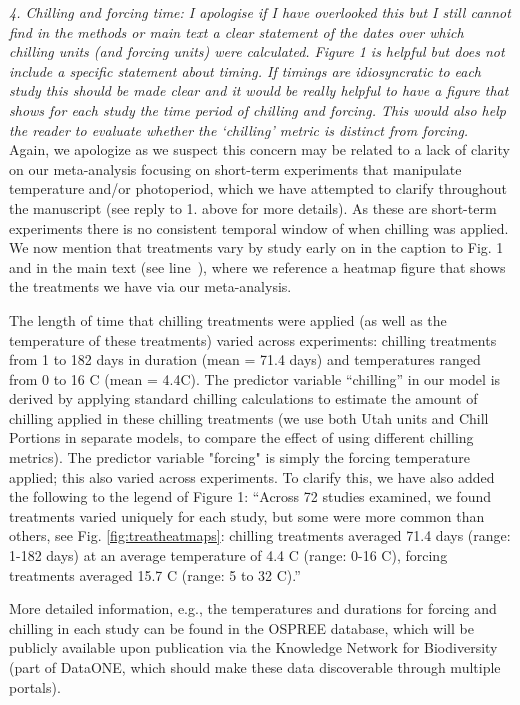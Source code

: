 \documentclass{article}
\newcommand{\lr}[1]{line~\lineref{#1}}
\begin{document}
\emph{4. Chilling and forcing time: I apologise if I have overlooked this but I still cannot find in the
methods or main text a clear statement of the dates over which chilling units (and forcing
units) were calculated. Figure 1 is helpful but does not include a specific statement about
timing. If timings are idiosyncratic to each study this should be made clear and it would be
really helpful to have a figure that shows for each study the time period of chilling and forcing.
This would also help the reader to evaluate whether the `chilling' metric is distinct from
forcing.}\\

Again, we apologize as we suspect this concern may be related to a lack of clarity on our meta-analysis focusing on short-term experiments that manipulate temperature and/or photoperiod, which we have attempted to clarify throughout the manuscript (see reply to 1. above for more details). As these are short-term experiments there is no consistent temporal window of when chilling was applied. We now mention that treatments vary by study early on in the caption to Fig. 1 and in the main text (see \lr{heatmap}), where we reference a heatmap figure that shows the treatments we have via our meta-analysis.

The length of time that chilling treatments were applied (as well as the temperature of these treatments) varied across experiments: chilling treatments from 1 to 182 days in duration (mean = 71.4 days) and temperatures ranged from  0 to 16 \degree C (mean = 4.4\degree C). The predictor variable ``chilling'' in our model is derived by applying standard chilling calculations to estimate the amount of chilling applied in these chilling treatments (we use both Utah units and Chill Portions in separate models, to compare the effect of using different chilling metrics). The predictor variable "forcing" is simply the forcing temperature applied; this also varied across experiments. To clarify this, we have also added the following to the legend of Figure 1: ``Across 72 studies examined, we found treatments varied uniquely for each study, but some were more common than others, see Fig. \ref{fig:treatheatmaps}: chilling treatments averaged 71.4 days (range: 1-182 days) at an average temperature of 4.4 \degree C (range: 0-16 \degree C), forcing treatments averaged 15.7 \degree C (range: 5 to 32 \degree C).''

More detailed information, e.g., the temperatures and durations for forcing and chilling in each study can be found in the OSPREE database, which will be publicly available upon publication via the Knowledge Network for Biodiversity (part of DataONE, which should make these data discoverable through multiple portals). \\
\end{document}
